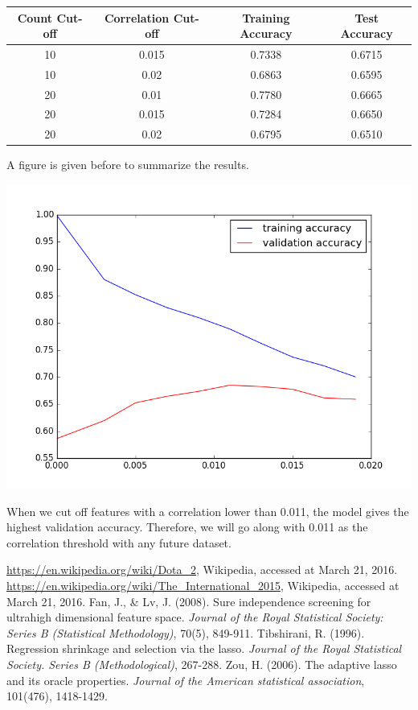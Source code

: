 \documentclass[11pt]{article}
\begin{document}
\begin{center}
\begin{tabular}{| c | c | c | c |}\hline
Count Cut-off & Correlation Cut-off & Training Accuracy & Test Accuracy \\\hline
	10 & 0.015 & 0.7338 & 0.6715 \\\hline
	10 & 0.02 & 0.6863 & 0.6595 \\\hline
	20 & 0.01 & 0.7780 & 0.6665 \\\hline
	20 & 0.015 & 0.7284 & 0.6650 \\\hline
	20 & 0.02 & 0.6795 & 0.6510 \\\hline
\end{tabular}
\end{center}
A figure is given before to summarize the results.
\begin{center}
\includegraphics[scale=0.6]{big_interval.png}
\end{center}
When we cut off features with a correlation lower than 0.011, the model gives the highest validation accuracy. Therefore, we will go along with 0.011 as the correlation threshold with any future dataset.

\begin{thebibliography}{9}
	 \url{https://en.wikipedia.org/wiki/Dota_2}, Wikipedia, accessed at March 21, 2016.
	 \url{https://en.wikipedia.org/wiki/The_International_2015}, Wikipedia, accessed at March 21, 2016.
	 Fan, J., \& Lv, J. (2008). Sure independence screening for ultrahigh dimensional feature space. \emph{Journal of the Royal Statistical Society: Series B (Statistical Methodology)}, 70(5), 849-911.
	 Tibshirani, R. (1996). Regression shrinkage and selection via the lasso. \emph{Journal of the Royal Statistical Society. Series B (Methodological)}, 267-288.
	 Zou, H. (2006). The adaptive lasso and its oracle properties. \emph{Journal of the American statistical association}, 101(476), 1418-1429.
\end{thebibliography}
\end{document}
